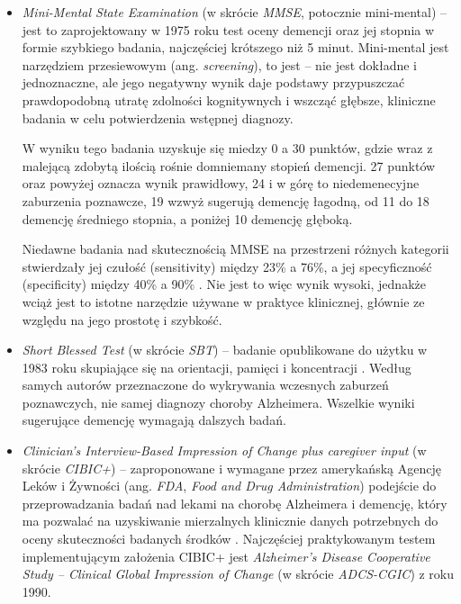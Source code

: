 \begin{itemize}

  \item \emph{Mini-Mental State Examination} (w skrócie \emph{MMSE}, potocznie mini-mental) -- jest to zaprojektowany w 1975 roku test oceny demencji oraz jej stopnia w formie szybkiego badania, najczęściej krótszego niż 5 minut.
        Mini-mental jest narzędziem przesiewowym (ang. \emph{screening}), to jest -- nie jest dokładne i jednoznaczne, ale jego negatywny wynik daje podstawy przypuszczać prawdopodobną utratę zdolności kognitywnych i wszcząć
        głębsze, kliniczne badania w celu potwierdzenia wstępnej diagnozy.

        W wyniku tego badania uzyskuje się miedzy 0 a 30 punktów, gdzie wraz z malejącą zdobytą ilością rośnie domniemany stopień demencji.
        27 punktów oraz powyżej oznacza wynik prawidłowy, 24 i w górę to niedemenecyjne zaburzenia poznawcze, 19 wzwyż sugerują demencję łagodną, od 11 do 18 demencję średniego stopnia, a poniżej 10 demencję głęboką.

        Niedawne badania nad skutecznością MMSE na przestrzeni różnych kategorii stwierdzały jej czułość (sensitivity) między 23\% a 76\%, a jej specyficzność (specificity) między 40\% a 90\% \cite{arevalo2015mini}.
        Nie jest to więc wynik wysoki, jednakże wciąż jest to istotne narzędzie używane w praktyce klinicznej, głównie ze względu na jego prostotę i szybkość.

  \item \emph{Short Blessed Test} (w skrócie \emph{SBT}) -- badanie opublikowane do użytku w 1983 roku skupiające się na orientacji, pamięci i koncentracji \cite{katzman1983validation}.
        Według samych autorów przeznaczone do wykrywania wczesnych zaburzeń poznawczych, nie samej diagnozy choroby Alzheimera.
        Wszelkie wyniki sugerujące demencję wymagają dalszych badań.

  \item \emph{Clinician's Interview-Based Impression of Change plus caregiver input} (w skrócie \emph{CIBIC+}) -- zaproponowane i wymagane przez amerykańską Agencję Leków i Żywności (ang. \emph{FDA}, \emph{Food and Drug Administration}) podejście do przeprowadzania badań nad lekami na chorobę Alzheimera i demencję, który ma pozwalać na uzyskiwanie mierzalnych klinicznie danych potrzebnych do oceny skuteczności badanych środków \cite{joffres2000qualitative}.
        Najczęściej praktykowanym testem implementującym założenia CIBIC+ jest \emph{Alzheimer's Disease Cooperative Study -- Clinical Global Impression of Change} (w skrócie \emph{ADCS-CGIC}) z roku 1990.


\end{itemize}
